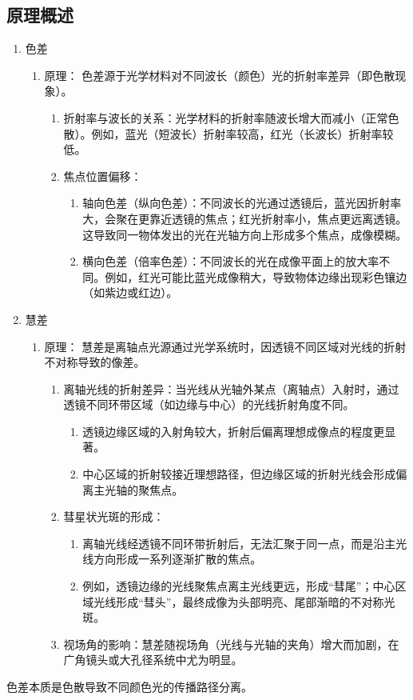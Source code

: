 \documentclass[dvipsnames, svgnames,a4paper,11pt]{article}
\begin{document}
\subsection{原理概述}
\begin{enumerate}
	\item 色差\begin{enumerate}
		\item 原理：
		色差源于光学材料对不同波长（颜色）光的折射率差异（即色散现象）。
		\begin{enumerate}
			\item 折射率与波长的关系：光学材料的折射率随波长增大而减小（正常色散）。例如，蓝光（短波长）折射率较高，红光（长波长）折射率较低。
			\item 焦点位置偏移：\begin{enumerate}
				\item 轴向色差（纵向色差）：不同波长的光通过透镜后，蓝光因折射率大，会聚在更靠近透镜的焦点；红光折射率小，焦点更远离透镜。这导致同一物体发出的光在光轴方向上形成多个焦点，成像模糊。
				\item 横向色差（倍率色差）：不同波长的光在成像平面上的放大率不同。例如，红光可能比蓝光成像稍大，导致物体边缘出现彩色镶边（如紫边或红边）。
			\end{enumerate}
		\end{enumerate}
	\end{enumerate}
	\item 慧差
	\begin{enumerate}
		\item 原理：
		慧差是离轴点光源通过光学系统时，因透镜不同区域对光线的折射不对称导致的像差。
		\begin{enumerate}
			\item 离轴光线的折射差异：当光线从光轴外某点（离轴点）入射时，通过透镜不同环带区域（如边缘与中心）的光线折射角度不同。
			\begin{enumerate}
				\item 透镜边缘区域的入射角较大，折射后偏离理想成像点的程度更显著。
				\item 中心区域的折射较接近理想路径，但边缘区域的折射光线会形成偏离主光轴的聚焦点。
			\end{enumerate}
			\item 彗星状光斑的形成：\begin{enumerate}
				\item 离轴光线经透镜不同环带折射后，无法汇聚于同一点，而是沿主光线方向形成一系列逐渐扩散的焦点。
				\item 例如，透镜边缘的光线聚焦点离主光线更远，形成“彗尾”；中心区域光线形成“彗头”，最终成像为头部明亮、尾部渐暗的不对称光斑。
			\end{enumerate}
			\item 视场角的影响：慧差随视场角（光线与光轴的夹角）增大而加剧，在广角镜头或大孔径系统中尤为明显。
		\end{enumerate}
	\end{enumerate}
\end{enumerate}
色差本质是色散导致不同颜色光的传播路径分离。
\end{document}
